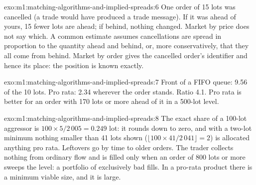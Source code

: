 \begin{solution}{exo:m1:matching-algorithms-and-implied-spreads:6}
One order of 15 lots was cancelled (a trade would have produced a trade
message). If it was ahead of yours, 15 fewer lots are ahead; if behind,
nothing changed. Market by price does not say which. A common estimate
assumes cancellations are spread in proportion to the quantity ahead and
behind, or, more conservatively, that they all come from behind. Market by
order gives the cancelled order's identifier and hence its place: the
position is known exactly.
\end{solution}

\begin{solution}{exo:m1:matching-algorithms-and-implied-spreads:7}
Front of a FIFO queue: 9.56 of the 10 lots. Pro rata: 2.34 wherever the order
stands. Ratio 4.1. Pro rata is better for an order with 170 lots or more
ahead of it in a 500-lot level.
\end{solution}

\begin{solution}{exo:m1:matching-algorithms-and-implied-spreads:8}
The exact share of a 100-lot aggressor is $100 \times 5/2\,005 = 0.249$ lot: it
rounds down to zero, and with a two-lot minimum nothing smaller than 41
lots shown ($\lfloor 100 \times 41/2\,041\rfloor = 2$) is allocated anything
pro rata. Leftovers go by time to older orders. The trader collects nothing
from ordinary flow and is filled only when an order of 800 lots or more
sweeps the level: a portfolio of exclusively bad fills. In a pro-rata product
there is a minimum viable size, and it is large.
\end{solution}


